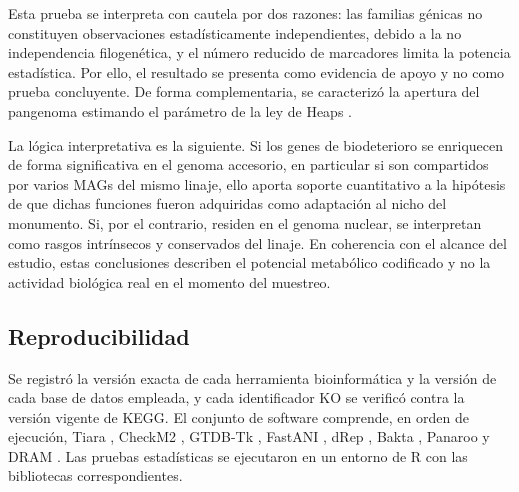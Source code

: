  Esta prueba se interpreta
con cautela por dos razones: las familias génicas no constituyen observaciones
estadísticamente independientes, debido a la no independencia filogenética, y
el número reducido de marcadores limita la potencia estadística. Por ello, el
resultado se presenta como evidencia de apoyo y no como prueba concluyente. De
forma complementaria, se caracterizó la apertura del pangenoma estimando el
parámetro de la ley de Heaps \cite{ppanggolin2020}.

La lógica interpretativa es la siguiente. Si los genes de biodeterioro se enriquecen de forma significativa en el genoma accesorio, en particular si son compartidos por varios MAGs del mismo linaje, ello aporta soporte cuantitativo a la hipótesis de que dichas funciones fueron adquiridas como adaptación al nicho del monumento. Si, por el contrario, residen en el genoma nuclear, se interpretan como rasgos intrínsecos y conservados del linaje. En coherencia con el alcance del estudio, estas conclusiones describen el potencial metabólico codificado y no la actividad biológica real en el momento del muestreo.


\subsection{Reproducibilidad}
Se registró la versión exacta de cada herramienta bioinformática y la versión de cada base de datos empleada, y cada identificador KO se verificó contra la versión vigente de KEGG. El conjunto de software comprende, en orden de ejecución, Tiara \cite{karlicki2022tiara}, CheckM2 \cite{checkm2}, GTDB-Tk \cite{gtdbtk2019}, FastANI \cite{fastANI2018}, dRep \cite{olm2017}, Bakta \cite{schwengers2021}, Panaroo \cite{panaroo2020} y DRAM \cite{dram2020}. Las pruebas estadísticas se ejecutaron en un entorno de R con las bibliotecas correspondientes.

